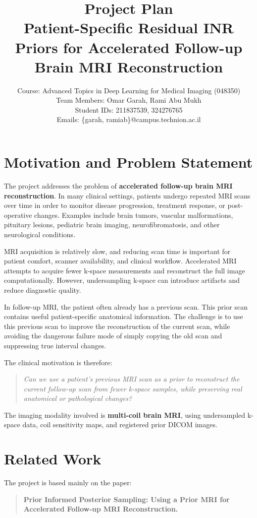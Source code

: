 \documentclass[11pt,a4paper]{article}
\title{\textbf{Project Plan}\\[0.5em]
Patient-Specific Residual INR Priors for Accelerated Follow-up Brain MRI Reconstruction}
\author{
Course: Advanced Topics in Deep Learning for Medical Imaging (048350)\\
Team Members: Omar Garah, Rami Abu Mukh\\
Student IDs: 211837539, 324276765\\
Emails: \{garah, ramiab\}@campus.technion.ac.il
}
\date{}
\begin{document}
\maketitle

\section{Motivation and Problem Statement}

The project addresses the problem of \textbf{accelerated follow-up brain MRI reconstruction}. In many clinical settings, patients undergo repeated MRI scans over time in order to monitor disease progression, treatment response, or post-operative changes. Examples include brain tumors, vascular malformations, pituitary lesions, pediatric brain imaging, neurofibromatosis, and other neurological conditions.

MRI acquisition is relatively slow, and reducing scan time is important for patient comfort, scanner availability, and clinical workflow. Accelerated MRI attempts to acquire fewer k-space measurements and reconstruct the full image computationally. However, undersampling k-space can introduce artifacts and reduce diagnostic quality.

In follow-up MRI, the patient often already has a previous scan. This prior scan contains useful patient-specific anatomical information. The challenge is to use this previous scan to improve the reconstruction of the current scan, while avoiding the dangerous failure mode of simply copying the old scan and suppressing true interval changes.

The clinical motivation is therefore:

\begin{quote}
\textit{Can we use a patient's previous MRI scan as a prior to reconstruct the current follow-up scan from fewer k-space samples, while preserving real anatomical or pathological changes?}
\end{quote}

The imaging modality involved is \textbf{multi-coil brain MRI}, using undersampled k-space data, coil sensitivity maps, and registered prior DICOM images.

\section{Related Work}

The project is based mainly on the paper:

\begin{quote}
\textbf{Prior Informed Posterior Sampling: Using a Prior MRI for Accelerated Follow-up MRI Reconstruction.}
\end{quote}
\end{document}
